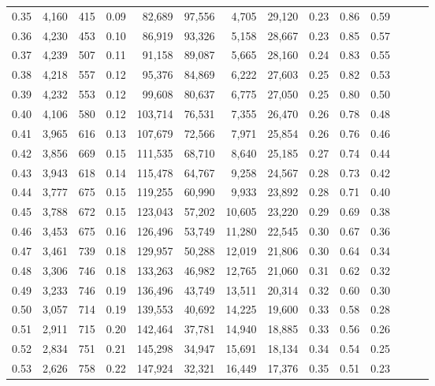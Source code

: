 \begin{tabular}{rrrrrrrrrrrrrr}
0.35 &  4,160 &  415 &  0.09 &   82,689 &   97,556 &   4,705 &  29,120 &  0.23 &  0.86 &      0.59 \\
0.36 &  4,230 &  453 &  0.10 &   86,919 &   93,326 &   5,158 &  28,667 &  0.23 &  0.85 &      0.57 \\
0.37 &  4,239 &  507 &  0.11 &   91,158 &   89,087 &   5,665 &  28,160 &  0.24 &  0.83 &      0.55 \\
0.38 &  4,218 &  557 &  0.12 &   95,376 &   84,869 &   6,222 &  27,603 &  0.25 &  0.82 &      0.53 \\
0.39 &  4,232 &  553 &  0.12 &   99,608 &   80,637 &   6,775 &  27,050 &  0.25 &  0.80 &      0.50 \\
0.40 &  4,106 &  580 &  0.12 &  103,714 &   76,531 &   7,355 &  26,470 &  0.26 &  0.78 &      0.48 \\
0.41 &  3,965 &  616 &  0.13 &  107,679 &   72,566 &   7,971 &  25,854 &  0.26 &  0.76 &      0.46 \\
0.42 &  3,856 &  669 &  0.15 &  111,535 &   68,710 &   8,640 &  25,185 &  0.27 &  0.74 &      0.44 \\
0.43 &  3,943 &  618 &  0.14 &  115,478 &   64,767 &   9,258 &  24,567 &  0.28 &  0.73 &      0.42 \\
0.44 &  3,777 &  675 &  0.15 &  119,255 &   60,990 &   9,933 &  23,892 &  0.28 &  0.71 &      0.40 \\
0.45 &  3,788 &  672 &  0.15 &  123,043 &   57,202 &  10,605 &  23,220 &  0.29 &  0.69 &      0.38 \\
0.46 &  3,453 &  675 &  0.16 &  126,496 &   53,749 &  11,280 &  22,545 &  0.30 &  0.67 &      0.36 \\
0.47 &  3,461 &  739 &  0.18 &  129,957 &   50,288 &  12,019 &  21,806 &  0.30 &  0.64 &      0.34 \\
0.48 &  3,306 &  746 &  0.18 &  133,263 &   46,982 &  12,765 &  21,060 &  0.31 &  0.62 &      0.32 \\
0.49 &  3,233 &  746 &  0.19 &  136,496 &   43,749 &  13,511 &  20,314 &  0.32 &  0.60 &      0.30 \\
0.50 &  3,057 &  714 &  0.19 &  139,553 &   40,692 &  14,225 &  19,600 &  0.33 &  0.58 &      0.28 \\
0.51 &  2,911 &  715 &  0.20 &  142,464 &   37,781 &  14,940 &  18,885 &  0.33 &  0.56 &      0.26 \\
0.52 &  2,834 &  751 &  0.21 &  145,298 &   34,947 &  15,691 &  18,134 &  0.34 &  0.54 &      0.25 \\
0.53 &  2,626 &  758 &  0.22 &  147,924 &   32,321 &  16,449 &  17,376 &  0.35 &  0.51 &      0.23 \\

\end{tabular}
